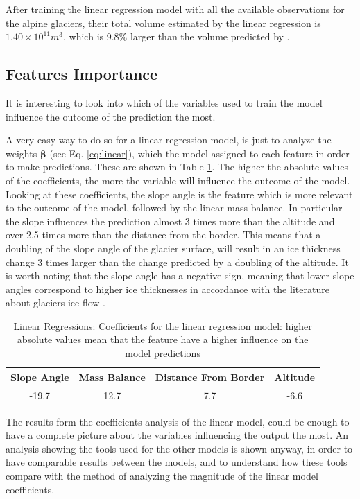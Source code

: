 After training the linear regression model with all the available observations for the alpine glaciers, their total volume estimated by the linear regression is $1.40 \times 10^{11}m^3$, which is 9.8\% larger than the volume predicted by \citet{Farinotti2019}.


\subsection{Features Importance}  

It is interesting to look into which of the variables used to train the model influence the outcome of the prediction the most.

A very easy way to do so for a linear regression model, is just to analyze the weights $\bm{\beta}$ (see Eq. \ref{eq:linear}), which the model assigned to each feature in order to make predictions. These are shown in Table \ref{tb:lr-coef}.
The higher the absolute values of the coefficients, the more the variable will influence the outcome of the model. Looking at these coefficients, the slope angle is the feature which is more relevant to the outcome of the model, followed by the linear mass balance. In particular the slope influences the prediction almost 3 times more than the altitude and over 2.5 times more than the distance from the border. This means that a doubling of the slope angle of the glacier surface, will result in an ice thickness change 3 times larger than the change predicted by a doubling of the altitude. It is worth noting that the slope angle has a negative sign, meaning that lower slope angles correspond to higher ice thicknesses in accordance with the literature about glaciers ice flow \cite[P. 298]{cuffey2010physics}.

\begin{table}
	\centering
	\caption{Linear Regressions: Coefficients for the linear regression model: higher absolute values mean that the feature have a higher influence on the model predictions}
	\begin{tabular}{|c|c|c|c|}
		\hline 
		Slope Angle&Mass Balance&Distance From Border&Altitude \\
		\hline
		-19.7&12.7&7.7&-6.6 \\
		\hline
	\end{tabular}
	\label{tb:lr-coef}
\end{table}

The results form the coefficients analysis of the linear model, could be enough to have a complete picture about the variables influencing the output the most. An analysis showing the tools used for the other models is shown anyway, in order to have comparable results between the models, and to understand how these tools compare with the method of analyzing the magnitude of the linear model coefficients. 

